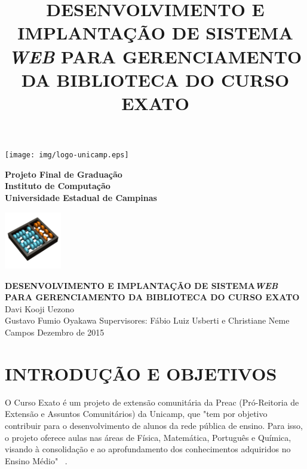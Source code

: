 \documentclass[a4paper]{article}
\title{DESENVOLVIMENTO E IMPLANTAÇÃO DE SISTEMA \textit{WEB} PARA GERENCIAMENTO DA BIBLIOTECA DO CURSO EXATO}
\begin{document}
\begin{minipage}[t|]{14mm}
\texttt{[image: img/logo-unicamp.eps]}
\end{minipage}
\hfill
\begin{minipage}[tl]{120mm}
\begin{center}
{\bf \sc Projeto Final de Graduação}\\
{\bf \sc Instituto de Computação} \\
{\bf \sc Universidade Estadual de Campinas} \\
\end{center}
\end{minipage}
\hfill
\begin{minipage}[c]{25mm}
\thispagestyle{empty}
\hspace{-0.5cm}
\includegraphics[width=25mm]{img/logo-ic.png}
\end{minipage}
\vfill\vfill
\begin{center}
\Huge{\textbf{DESENVOLVIMENTO E IMPLANTAÇÃO DE SISTEMA\textit{WEB} PARA GERENCIAMENTO DA BIBLIOTECA DO CURSO EXATO}}
\vfill\vfill
\huge{Davi Kooji Uezono\\Gustavo Fumio Oyakawa}
\vfill
\Large{Supervisores: Fábio Luiz Usberti e Christiane Neme Campos}
\vfill\vfill
\Large{Dezembro de 2015}
\end{center}
\vfill

\pagebreak
{}
\tableofcontents{}

\pagebreak
\clearpage
{}
\setcounter{page}{1}
\section{INTRODUÇÃO E OBJETIVOS}

O Curso Exato é um projeto de extensão comunitária da Preac (Pró-Reitoria de Extensão e Assuntos Comunitários) da Unicamp, que "tem por objetivo contribuir para o desenvolvimento de alunos da rede pública de ensino. Para isso, o projeto oferece aulas nas áreas de Física, Matemática, Português e Química, visando à consolidação e ao aprofundamento dos conhecimentos adquiridos no Ensino Médio" \ \cite{cursoexato}.
\end{document}

